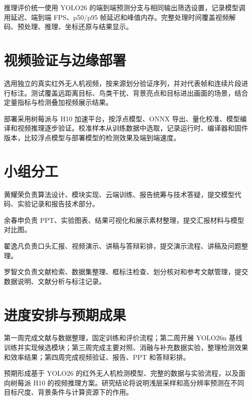 推理评价统一使用 YOLO26 的端到端预测分支与相同输出筛选设置，记录模型调用延迟、端到端 FPS、p50/p95 帧延迟和峰值内存。完整处理时间覆盖视频解码、预处理、推理、坐标还原与结果显示。

\section{视频验证与边缘部署}
选用独立的真实红外无人机视频，按来源划分验证序列，并对代表帧和连续片段进行标注。测试覆盖远距离目标、鸟类干扰、背景亮点和目标进出画面的场景，结合定量指标与检测叠加视频展示结果。

部署采用树莓派与 H10 加速平台，按浮点模型、ONNX 导出、量化校准、模型编译和视频推理逐步验证。校准样本从训练数据中选取，记录运行时、编译器和固件版本，比较浮点模型与部署模型的检测效果及端到端速度。

\section{小组分工}
黄耀荣负责算法设计、模块实现、云端训练、报告统筹与技术答疑，提交模型代码、实验记录和报告技术部分。

余春申负责 PPT、实验图表、结果可视化和展示素材整理，提交汇报材料与模型对比图。

翟逸凡负责口头汇报、视频演示、讲稿与答辩彩排，提交演示流程、讲稿及问题整理。

罗智文负责文献检索、数据集整理、框标注检查、划分核对和参考文献管理，提交数据说明、文献分析与标注记录。

\section{进度安排与预期成果}
第一周完成文献与数据整理，固定训练和评价流程；第二周开展 YOLO26n 基线训练并实现候选模块；第三周完成主要对照、消融与补充数据实验，整理检测效果和效率结果；第四周完成视频验证、报告、PPT 和答辩彩排。

预期形成基于 YOLO26 的红外无人机检测模型、完整的数据与实验流程，以及面向树莓派 H10 的视频推理方案。研究结论将说明浅层采样和高分辨率预测在不同目标尺度、背景条件与计算资源下的作用。

